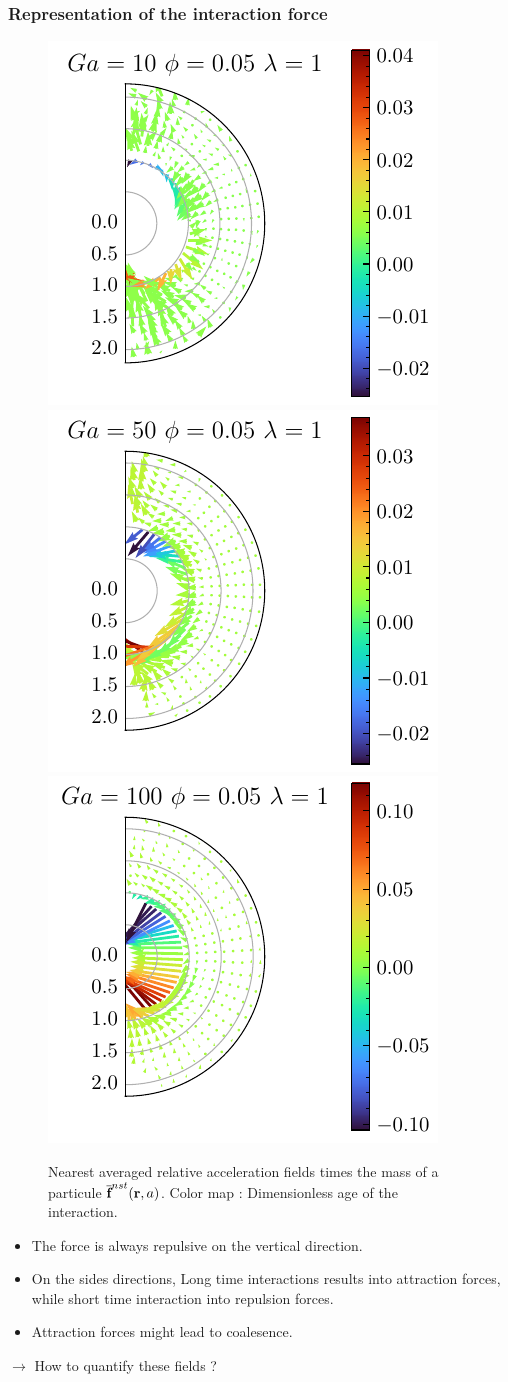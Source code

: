 \documentclass{sintefbeamer}
\begin{document}
\begin{frame}
  \frametitle{Representation of the interaction force}

  \begin{figure}
    \includegraphics[height=0.25\textwidth]{image/HOMOGENEOUS_NEW/Dist/F_rel_l_1_Ga_10_PHI_5.pdf}
    \includegraphics[height=0.25\textwidth]{image/HOMOGENEOUS_NEW/Dist/F_rel_l_1_Ga_50_PHI_5.pdf}
    \includegraphics[height=0.25\textwidth]{image/HOMOGENEOUS_NEW/Dist/F_rel_l_1_Ga_100_PHI_5.pdf}
    
    \caption{Nearest averaged relative acceleration fields times the mass of a particule $\overline{\textbf{f}}^{nst}(\textbf{r},a)$. 
    Color map : Dimensionless age of the interaction.}
  \end{figure}

  
\begin{itemize}
  \item The force is always repulsive on the vertical direction.  
  \item On the sides  directions, Long time interactions results into attraction forces, while short time interaction into repulsion forces.
  \item Attraction forces might lead to coalesence. 
\end{itemize}

$\rightarrow$ How to quantify these fields ? 
\end{frame}
\end{document}
